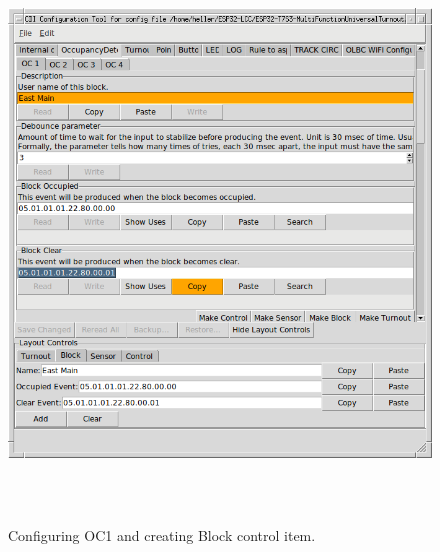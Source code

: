\documentclass[12pt,twoside]{article}
\begin{document}
\begin{figure}[hbpt]\begin{centering}%
\includegraphics[height=6in]{ExampleSidingCP1-ConfigOC1.png}
\caption{Configuring OC1 and creating Block control item.}
\label{fig:ExampleSidingCP1-ConfigOC1}
\end{centering}\end{figure}
\end{document}
